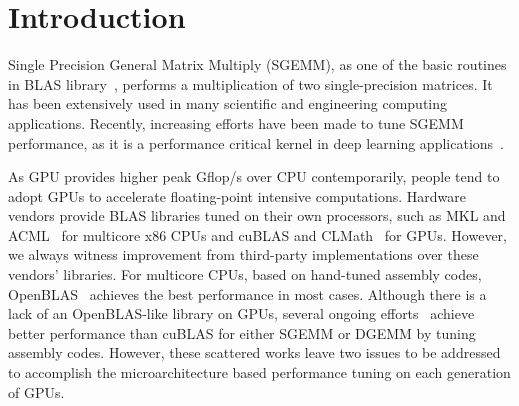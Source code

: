 \section{Introduction}
Single Precision General Matrix Multiply (SGEMM), as one 
of the basic routines in BLAS library~\cite{blas}, performs a multiplication of two single-precision matrices. 
It has been extensively used in many scientific and engineering 
computing applications. 
Recently, increasing efforts have been made to tune SGEMM performance, as it is a performance 
critical kernel in deep learning applications~\cite{chetlur2014cudnn,nervana_sgemm_wiki}.

As GPU provides higher peak Gflop/s over CPU contemporarily, people tend to adopt GPUs to accelerate
floating-point intensive computations. %
Hardware vendors provide BLAS libraries tuned on their own processors, such as MKL and ACML~\cite{intel2007intel,amd2014} for multicore 
x86 CPUs and cuBLAS and CLMath~\cite{nvidia2008cublas, clmath} for
GPUs. However, we always witness improvement from third-party implementations over these vendors' libraries. For
multicore CPUs, based on hand-tuned assembly codes, OpenBLAS~\cite{xianyi2012openblas} achieves the best performance in 
most cases.
Although there is a lack of an OpenBLAS-like library on GPUs, several ongoing efforts~\cite{tan,lai,nervana_sgemm_wiki,
chien, volkov} achieve better performance than cuBLAS for either SGEMM or DGEMM by tuning assembly codes. However, 
these scattered works leave two issues to be addressed to accomplish the microarchitecture based performance tuning on 
each generation of GPUs.

